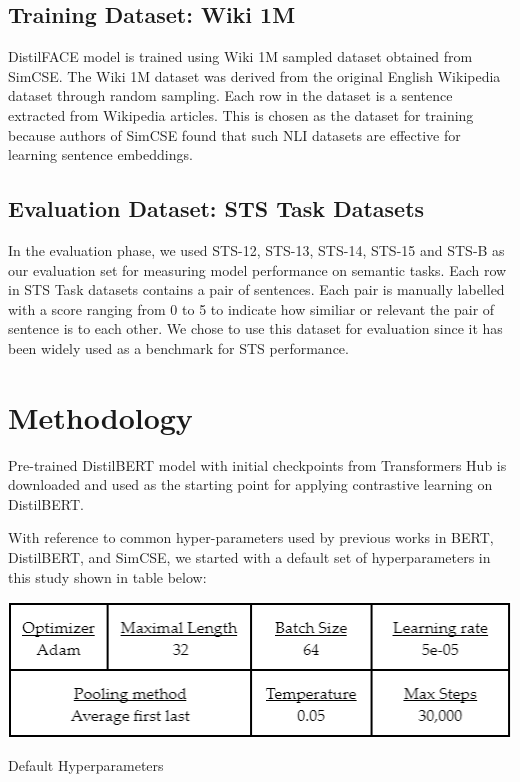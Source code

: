\documentclass[10pt,twocolumn,letterpaper]{article}
\begin{document}
\subsection{Training Dataset: Wiki 1M}
DistilFACE model is trained using Wiki 1M sampled dataset obtained from SimCSE. The Wiki 1M dataset was derived from the original English Wikipedia dataset through random sampling. Each row in the dataset is a sentence extracted from Wikipedia articles. This is chosen as the dataset for training because authors of SimCSE \cite{2104.08821} found that such NLI datasets are effective for learning sentence embeddings. 

\subsection{Evaluation Dataset: STS Task Datasets}

In the evaluation phase, we used STS-12, STS-13, STS-14, STS-15 and STS-B as our evaluation set for measuring model performance on semantic tasks. Each row in STS Task datasets contains a pair of sentences. Each pair is manually labelled with a score ranging from 0 to 5 to indicate how similiar or relevant the pair of sentence is to each other. We chose to use this dataset for evaluation since it has been widely used as a benchmark for STS performance.

\section{Methodology}

Pre-trained DistilBERT model with initial checkpoints from Transformers Hub is downloaded and used as the starting point for applying contrastive learning on DistilBERT.

With reference to common hyper-parameters used by previous works in BERT, DistilBERT, and SimCSE, we started with a default set of hyperparameters in this study shown in table below:

\begin{table}[hbt!]
\centering
\includegraphics[scale=0.57]{images/Default-Hyperparameters.png}
\caption{Default Hyperparameters}
\label{fig:short}
\end{table}
\end{document}
